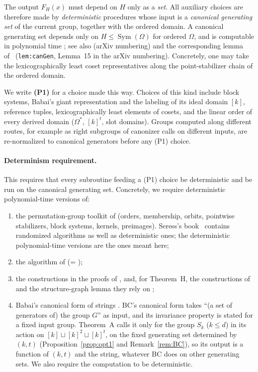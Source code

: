 \documentclass[11pt]{article}
\newenvironment{enumlab}[2][]{\begin{enumerate}\renewcommand{\theenumi}{#1#2{enumi}}%
  \renewcommand{\labelenumi}{(\theenumi)}}{\end{enumerate}}
\theoremstyle{plain}
\theoremstyle{definition}
\theoremstyle{remark}
\theoremstyle{named}
\theoremstyle{namedrm}
\newcommand{\Sym}{\operatorname{Sym}}
\begin{document}
The output $F_H(x)$ must depend on $H$ only as a \emph{set}. All auxiliary choices are therefore made by
\emph{deterministic} procedures whose input is a \emph{canonical generating set} of the current group,
together with the ordered domain. A canonical generating set depends only on $H\le\Sym(\Omega)$ for
ordered $\Omega$, and is computable in polynomial time \cite[Lemma~6.2]{AGMMM18}; see also
\cite[Lemma~21]{GNSW} (arXiv numbering) and the corresponding lemma of~\cite{SW19}
(\texttt{lem:canGen}, Lemma~15 in the arXiv numbering). Concretely, one may take the lexicographically
least coset representatives along the point-stabilizer chain of the ordered domain.

We write \textbf{(P1)} for a choice made this way. Choices of this kind include block systems, Babai's
giant representation \cite[Lemma~7.1]{GNS} and the labeling of its ideal domain $[k]$, reference tuples,
lexicographically least elements of cosets, and the linear order of every derived domain
($\Omega^*$, $[k]^t$, slot domains). Groups computed along different routes, for example as right
subgroups of canonizer calls on different inputs, are re-normalized to canonical generators before any
(P1) choice.

\paragraph{Determinism requirement.} This requires that every subroutine feeding a (P1) choice be
deterministic and be run on the canonical generating set. Concretely, we require deterministic
polynomial-time versions of:
\begin{enumlab}[D]{\arabic}
\item\label{D1} the permutation-group toolkit of \cite[Thm.~2.1]{GNS} (orders, membership, orbits,
  pointwise stabilizers, block systems, kernels, preimages). Seress's book~\cite{Ser03} contains
  randomized algorithms as well as deterministic ones; the deterministic polynomial-time versions are
  the ones meant here;
\item\label{D2} the algorithm of \cite[Lemma~7.1]{GNS} (= \cite[Thm.~3.2.1]{Bab15});
\item\label{D3} the constructions in the proofs of \cite[Thms.~4.3, 4.6]{GNS}, and, for Theorem~H, the
  constructions of \cite[Thms.~4.8, 4.9, 4.17]{Neu20} and the structure-graph lemma they rely on
  \cite[Lemma~6.1.17]{Neu19};
\item\label{D4} Babai's canonical form of strings \cite[Thm.~2.2]{Bab19}. BC's canonical form takes
  ``(a set of generators of) the group $G$'' as input, and its invariance property is stated for a fixed
  input group. Theorem~A calls it only for the group $S_k$ ($k\le d$) in its action on
  $[k]\sqcup[k]^2\sqcup[k]^t$, on the fixed generating set determined by $(k,t)$
  (Proposition~\ref{prop:opt1} and Remark~\ref{rem:BC}), so its output is a function of $(k,t)$ and the
  string, whatever BC does on other generating sets. We also require the computation to be deterministic.
\end{enumlab}
\end{document}
